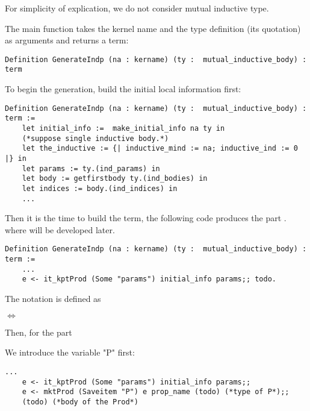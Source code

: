 \documentclass[a4paper,UKenglish,cleveref, autoref, thm-restate]{lipics-v2021}
\begin{document}
For simplicity of explication, we do not consider mutual inductive type.


The main function takes the kernel name and the type definition (its quotation) as arguments and returns a term:
\begin{lstlisting}[language = {Coq}, basicstyle = \small]
Definition GenerateIndp (na : kername) (ty :  mutual_inductive_body) : term 
\end{lstlisting}

To begin the generation, build the initial local information first:


\begin{lstlisting}[language = {Coq}, basicstyle = \small]
Definition GenerateIndp (na : kername) (ty :  mutual_inductive_body) : term :=
    let initial_info :=  make_initial_info na ty in
    (*suppose single inductive body.*)
    let the_inductive := {| inductive_mind := na; inductive_ind := 0 |} in
    let params := ty.(ind_params) in
    let body := getfirstbody ty.(ind_bodies) in
    let indices := body.(ind_indices) in
    ...
\end{lstlisting}

Then it is the time to build the  term, the following code produces the part . where  will be developed later.



\begin{lstlisting}[language = {Coq}, basicstyle = \small]
Definition GenerateIndp (na : kername) (ty :  mutual_inductive_body) : term :=
    ...
    e <- it_kptProd (Some "params") initial_info params;; todo.
\end{lstlisting}

\begin{remark}
The notation  is defined as

 $\Leftrightarrow$ 
\end{remark}


Then, for the part

We introduce the variable "P" first:

\begin{lstlisting}[language = {Coq}, basicstyle = \small]
    ...
    e <- it_kptProd (Some "params") initial_info params;;
    e <- mktProd (Saveitem "P") e prop_name (todo) (*type of P*);;
    (todo) (*body of the Prod*)
\end{lstlisting}
\end{document}
